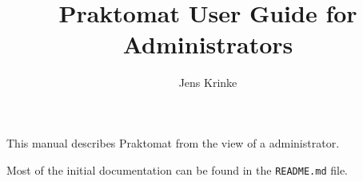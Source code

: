 \documentclass{article}
\begin{document}
\title{Praktomat User Guide for Administrators}
\author{Jens Krinke}
\maketitle

This manual describes Praktomat from the view of a administrator.

\tableofcontents



Most of the initial documentation can be found in the
\texttt{README.md} file.
\end{document}
